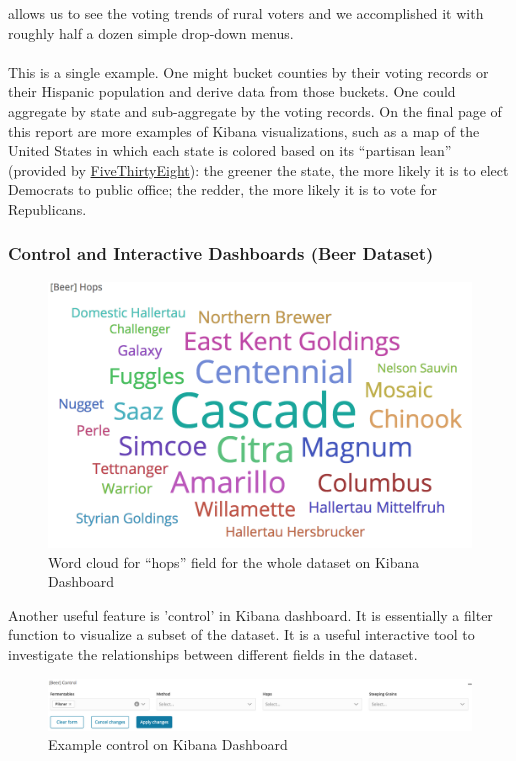 \documentclass[bibliography=totoc]{article}
\begin{document}
allows us to see the voting trends of rural voters and we accomplished it with roughly half a dozen simple
drop-down menus.
\\
\\
This is a single example. One might bucket counties by their voting records or their Hispanic population and
derive data from those buckets. One could aggregate by state and sub-aggregate by the voting records. On the
final page of this report are more examples of Kibana visualizations, such as a map of the United States
in which each state is colored based on its “partisan lean” (provided by \href{https://github.com/fivethirtyeight/data/blob/master/partisan-lean/fivethirtyeight_partisan_lean_STATES.csv}{FiveThirtyEight}):
the greener the state, the more likely it is to elect Democrats to public office; the redder, the more likely
it is to vote for Republicans.

\subsubsection{Control and Interactive Dashboards (Beer Dataset)}
\begin{figure}[!hb]
  \centering
  \includegraphics[width=\linewidth]{beer_hops.png}
 \caption{Word cloud for ``hops'' field for the whole dataset on Kibana Dashboard}
  \label{fig:beer_hops}
\end{figure}

Another useful feature is 'control' in Kibana dashboard. It is essentially a filter function to visualize a subset of the dataset. It is a useful interactive tool to investigate the relationships between different fields in the dataset.

\begin{figure}
  \centering
  \includegraphics[width=\linewidth]{beer_control.png}
 \caption{Example control on Kibana Dashboard}
  \label{fig:beer_control}
\end{figure}
\end{document}
